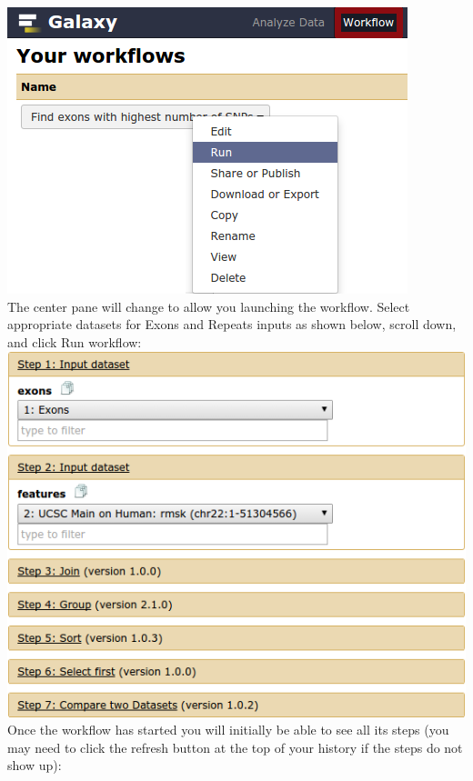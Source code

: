 \documentclass[11pt,a4paper]{article}
\begin{document}
\includegraphics[scale=0.55]{figures/101_37}\\
The center pane will change to allow you launching the workflow. Select appropriate datasets for Exons and Repeats inputs as shown below, scroll down, and click Run workflow:\\

\includegraphics[scale=0.55]{figures/101_38}\\
Once the workflow has started you will initially be able to see all its steps (you may need to click the refresh button at the top of your history if the steps do not show up):\\
\end{document}
